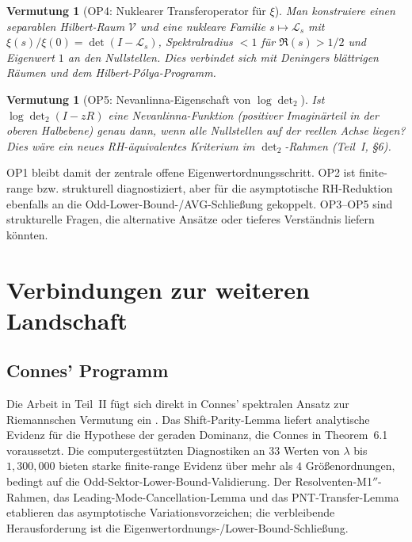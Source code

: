 \documentclass[12pt,a4paper]{article}
\newtheorem{conjecture}[theorem]{Vermutung}
\theoremstyle{definition}
\theoremstyle{remark}
\begin{document}
\begin{conjecture}[OP4: Nuklearer Transferoperator für $\xi$]
\label{conj:OP4}
Man konstruiere einen separablen Hilbert-Raum $\mathcal{V}$ und eine nukleare Familie $s \mapsto \mathcal{L}_s$ mit $\xi(s)/\xi(0) = \det(I - \mathcal{L}_s)$, Spektralradius $< 1$ für $\Re(s) > 1/2$ und Eigenwert $1$ an den Nullstellen. Dies verbindet sich mit Deningers blättrigen Räumen und dem Hilbert-P\'olya-Programm.
\end{conjecture}

\begin{conjecture}[OP5: Nevanlinna-Eigenschaft von $\log\det_2$]
\label{conj:OP5}
Ist $\log\det_2(I - zR)$ eine Nevanlinna-Funktion (positiver Imaginärteil in der oberen Halbebene) genau dann, wenn alle Nullstellen auf der reellen Achse liegen? Dies wäre ein neues RH-äquivalentes Kriterium im $\det_2$-Rahmen (Teil~I, \S6).
\end{conjecture}

\noindent OP1 bleibt damit der zentrale offene Eigenwertordnungsschritt. OP2 ist finite-range bzw. strukturell diagnostiziert, aber für die asymptotische RH-Reduktion ebenfalls an die Odd-Lower-Bound-/AVG-Schließung gekoppelt. OP3--OP5 sind strukturelle Fragen, die alternative Ansätze oder tieferes Verständnis liefern könnten.


\section{Verbindungen zur weiteren Landschaft}
\label{sec:connections}

\subsection{Connes' Programm}

Die Arbeit in Teil~II fügt sich direkt in Connes' spektralen Ansatz zur Riemannschen Vermutung ein \cite{Connes2026}. Das Shift-Parity-Lemma liefert analytische Evidenz für die Hypothese der geraden Dominanz, die Connes in Theorem~6.1 voraussetzt. Die computergestützten Diagnostiken an $33$ Werten von $\lambda$ bis $1{,}300{,}000$ bieten starke finite-range Evidenz über mehr als $4$ Größenordnungen, bedingt auf die Odd-Sektor-Lower-Bound-Validierung. Der Resolventen-M1$''$-Rahmen, das Leading-Mode-Cancellation-Lemma und das PNT-Transfer-Lemma etablieren das asymptotische Variationsvorzeichen; die verbleibende Herausforderung ist die Eigenwertordnungs-/Lower-Bound-Schließung.
\end{document}
